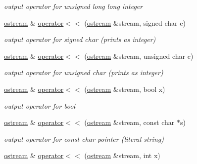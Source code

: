 \begin{DoxyCompactItemize}
\begin{DoxyCompactList}\small\item\em output operator for unsigned long long integer \end{DoxyCompactList}\item 
\hyperlink{classhwlib_1_1ostream}{ostream} \& \hyperlink{classhwlib_1_1ostream_a62d3d656e6a5021fc4a6aa6940b5641e}{operator$<$$<$} (\hyperlink{classhwlib_1_1ostream}{ostream} \&stream, signed char c)\hypertarget{classhwlib_1_1ostream_a62d3d656e6a5021fc4a6aa6940b5641e}{}\label{classhwlib_1_1ostream_a62d3d656e6a5021fc4a6aa6940b5641e}

\begin{DoxyCompactList}\small\item\em output operator for signed char (prints as integer) \end{DoxyCompactList}\item 
\hyperlink{classhwlib_1_1ostream}{ostream} \& \hyperlink{classhwlib_1_1ostream_a3fea1f54c018fe926d9c7ee25ebd917a}{operator$<$$<$} (\hyperlink{classhwlib_1_1ostream}{ostream} \&stream, unsigned char c)\hypertarget{classhwlib_1_1ostream_a3fea1f54c018fe926d9c7ee25ebd917a}{}\label{classhwlib_1_1ostream_a3fea1f54c018fe926d9c7ee25ebd917a}

\begin{DoxyCompactList}\small\item\em output operator for unsigned char (prints as integer) \end{DoxyCompactList}\item 
\hyperlink{classhwlib_1_1ostream}{ostream} \& \hyperlink{classhwlib_1_1ostream_a253a2e284130cc22d3dff3fbf669afae}{operator$<$$<$} (\hyperlink{classhwlib_1_1ostream}{ostream} \&stream, bool x)\hypertarget{classhwlib_1_1ostream_a253a2e284130cc22d3dff3fbf669afae}{}\label{classhwlib_1_1ostream_a253a2e284130cc22d3dff3fbf669afae}

\begin{DoxyCompactList}\small\item\em output operator for bool \end{DoxyCompactList}\item 
\hyperlink{classhwlib_1_1ostream}{ostream} \& \hyperlink{classhwlib_1_1ostream_a45bbf00f11c411f55e5eef9b28165fa6}{operator$<$$<$} (\hyperlink{classhwlib_1_1ostream}{ostream} \&stream, const char $\ast$s)\hypertarget{classhwlib_1_1ostream_a45bbf00f11c411f55e5eef9b28165fa6}{}\label{classhwlib_1_1ostream_a45bbf00f11c411f55e5eef9b28165fa6}

\begin{DoxyCompactList}\small\item\em output operator for const char pointer (literal string) \end{DoxyCompactList}\item 
\hyperlink{classhwlib_1_1ostream}{ostream} \& \hyperlink{classhwlib_1_1ostream_a28ee741656d0ad9d6a1782823212e7d9}{operator$<$$<$} (\hyperlink{classhwlib_1_1ostream}{ostream} \&stream, int x)\hypertarget{classhwlib_1_1ostream_a28ee741656d0ad9d6a1782823212e7d9}{}\label{classhwlib_1_1ostream_a28ee741656d0ad9d6a1782823212e7d9}


\end{DoxyCompactItemize}
